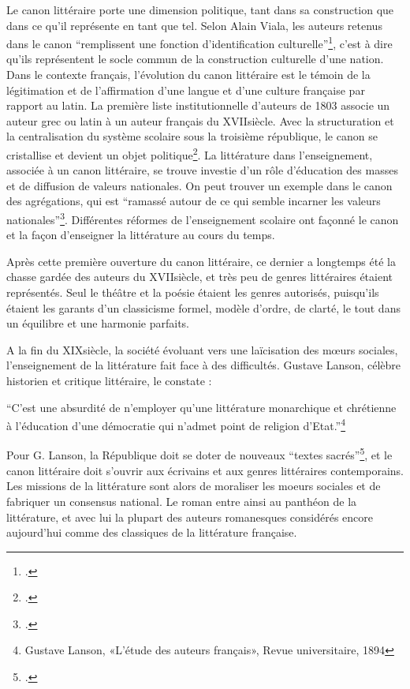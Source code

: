 Le canon littéraire porte une dimension politique, tant dans sa construction que dans ce qu'il représente en tant que tel. Selon Alain Viala, les auteurs retenus dans le canon \enquote{remplissent une fonction d’identification culturelle}\footcites{viala_quest-ce_1993}, c'est à dire qu'ils représentent le socle commun de la construction culturelle d'une nation. Dans le contexte français, l'évolution du canon littéraire est le témoin de la légitimation et de l'affirmation d'une langue et d'une culture française par rapport au latin. La première liste institutionnelle d'auteurs de 1803 associe un auteur grec ou latin à un auteur français du XVII\ieme siècle. Avec la structuration et la centralisation du système scolaire sous la troisième république, le canon se cristallise et devient un objet politique\footcites{compagnon_troisieme_1983}. La littérature dans l'enseignement, associée à un canon littéraire, se trouve investie d'un rôle d'éducation des masses et de diffusion de valeurs nationales. On peut trouver un exemple dans le canon des agrégations, qui est \enquote{ramassé autour de ce qui semble incarner les valeurs nationales}\footcites{jey_canon_2014}. Différentes réformes de l'enseignement scolaire ont façonné le canon et la façon d'enseigner la littérature au cours du temps.

Après cette première ouverture du canon littéraire, ce dernier a longtemps été la chasse gardée des auteurs du XVII\ieme siècle, et très peu de genres littéraires étaient représentés. Seul le théâtre et la poésie étaient les genres autorisés, puisqu'ils étaient les garants d'un classicisme formel, modèle d'ordre, de clarté, le tout dans un équilibre et une harmonie parfaits.

A la fin du XIX\ieme siècle, la société évoluant vers une laïcisation des mœurs sociales, l'enseignement de la littérature fait face à des difficultés. Gustave Lanson, célèbre historien et critique littéraire, le constate : 
\begin{displayquote} \enquote{C'est une absurdité de n'employer qu'une littérature monarchique et chrétienne à l'éducation d'une démocratie qui n'admet point de religion d'Etat.}\footnote{Gustave Lanson, «L'étude des auteurs français», Revue universitaire, 1894}
\end{displayquote}

Pour G. Lanson, la République doit se doter de nouveaux \enquote{textes sacrés}\footcites{compagnon_demon_1998}, et le canon littéraire doit s'ouvrir aux écrivains et aux genres littéraires contemporains. Les missions de la littérature sont alors de moraliser les moeurs sociales et de fabriquer un consensus national. Le roman entre ainsi au panthéon de la littérature, et avec lui la plupart des auteurs romanesques considérés encore aujourd'hui comme des classiques de la littérature française. 

